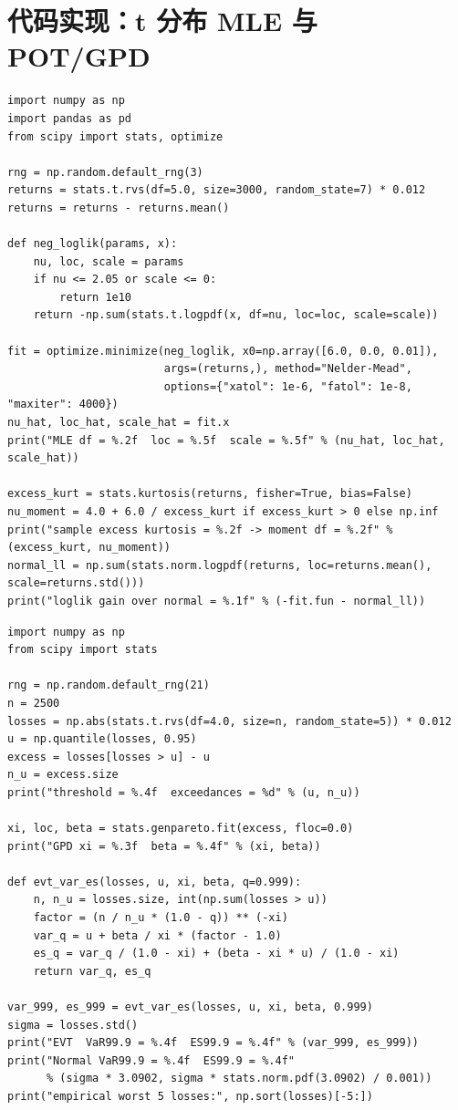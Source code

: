 \section{代码实现：t 分布 MLE 与 POT/GPD}

\begin{lstlisting}[style=pythonstyle,
                   caption={用极大似然估计学生 t 分布自由度并与矩估计对比},
                   label={lst:08-tmle}]
import numpy as np
import pandas as pd
from scipy import stats, optimize

rng = np.random.default_rng(3)
returns = stats.t.rvs(df=5.0, size=3000, random_state=7) * 0.012
returns = returns - returns.mean()

def neg_loglik(params, x):
    nu, loc, scale = params
    if nu <= 2.05 or scale <= 0:
        return 1e10
    return -np.sum(stats.t.logpdf(x, df=nu, loc=loc, scale=scale))

fit = optimize.minimize(neg_loglik, x0=np.array([6.0, 0.0, 0.01]),
                        args=(returns,), method="Nelder-Mead",
                        options={"xatol": 1e-6, "fatol": 1e-8, "maxiter": 4000})
nu_hat, loc_hat, scale_hat = fit.x
print("MLE df = %.2f  loc = %.5f  scale = %.5f" % (nu_hat, loc_hat, scale_hat))

excess_kurt = stats.kurtosis(returns, fisher=True, bias=False)
nu_moment = 4.0 + 6.0 / excess_kurt if excess_kurt > 0 else np.inf
print("sample excess kurtosis = %.2f -> moment df = %.2f" % (excess_kurt, nu_moment))
normal_ll = np.sum(stats.norm.logpdf(returns, loc=returns.mean(), scale=returns.std()))
print("loglik gain over normal = %.1f" % (-fit.fun - normal_ll))
\end{lstlisting}

\begin{lstlisting}[style=pythonstyle,
                   caption={POT 方法拟合 GPD 并计算极端分位的 VaR 与 ES},
                   label={lst:08-pot}]
import numpy as np
from scipy import stats

rng = np.random.default_rng(21)
n = 2500
losses = np.abs(stats.t.rvs(df=4.0, size=n, random_state=5)) * 0.012
u = np.quantile(losses, 0.95)
excess = losses[losses > u] - u
n_u = excess.size
print("threshold = %.4f  exceedances = %d" % (u, n_u))

xi, loc, beta = stats.genpareto.fit(excess, floc=0.0)
print("GPD xi = %.3f  beta = %.4f" % (xi, beta))

def evt_var_es(losses, u, xi, beta, q=0.999):
    n, n_u = losses.size, int(np.sum(losses > u))
    factor = (n / n_u * (1.0 - q)) ** (-xi)
    var_q = u + beta / xi * (factor - 1.0)
    es_q = var_q / (1.0 - xi) + (beta - xi * u) / (1.0 - xi)
    return var_q, es_q

var_999, es_999 = evt_var_es(losses, u, xi, beta, 0.999)
sigma = losses.std()
print("EVT  VaR99.9 = %.4f  ES99.9 = %.4f" % (var_999, es_999))
print("Normal VaR99.9 = %.4f  ES99.9 = %.4f"
      % (sigma * 3.0902, sigma * stats.norm.pdf(3.0902) / 0.001))
print("empirical worst 5 losses:", np.sort(losses)[-5:])
\end{lstlisting}

